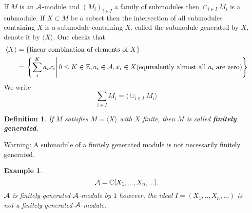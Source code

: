 \documentclass[11pt]{article}
\newtheorem{dfn}[thm]{Definition}
\newtheorem{ex}[thm]{Example}
\newcommand{\cplx}{\mathbb C}
\newcommand{\intg}{\mathbb Z}
\newcommand{\cala}{{\cal A}}
\newcommand{\lgl}{\langle}
\newcommand{\rgl}{\rangle}
\begin{document}
If $M$ is an $\cala$-module and $(M_i)_{i\in I} $ a family of submodules then $\cap_{i\in I} M_i$ is a submodule.
If $X\subset M$ be a  subset then the intersection of all submodules  containing $X$ is a submodule containing $X$, called the  submodule generated by $X$, denote it by $\lgl X\rgl$.
One checks that 
$$
\begin{aligned}
\lgl X\rgl&=\left\{\text{linear combination of elements of } X\right\}\\
&=\left.\left\{\sum^K_i a_i x_i\right|0\leq K\in \intg, a_i\in\cala, x_i\in X(\text{equivalently almost all $a_i$ are zero})\right\}
\end{aligned}
$$
We write 
$$
\sum_{i\in I} M_i=\lgl \cup_{i\in I} M_i\rgl
$$
\begin{dfn}
If $M$ satisfies $M=\lgl X\rgl$ with $X$ finite, then $M$ is called \textbf{finitely generated}.
\end{dfn}
Warning: A submodule of a finitely generated module is not necessarily finitely generated.
\begin{ex}
$$
\cala=\cplx[X_1,...,X_n,...].
$$
$\cala$ is finitely generated $\cala$-module by $1$ however, the ideal 
$
I=(X_1,..,X_n,...)$ is not a finitely generated $\cala$-module.
\end{ex}
\end{document}

